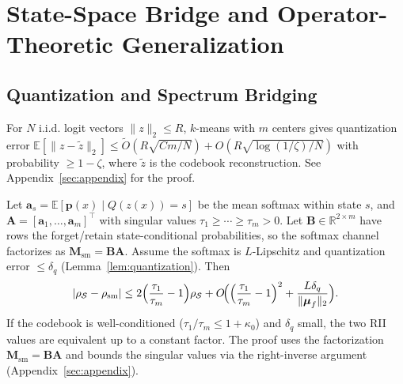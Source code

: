 \documentclass[smallextended]{svjour3}       %
\begin{document}
\section{State-Space Bridge and Operator-Theoretic Generalization}
\label{app:bridge}

\subsection{Quantization and Spectrum Bridging}

\begin{lemma}
\label{lem:quantization}
For $N$ i.i.d. logit vectors $\|z\|_2\le R$, $k$-means with $m$ centers gives quantization error $\mathbb{E}[\|z-\tilde{z}\|_2] \le \tilde{O}(R\sqrt{Cm/N}) + O(R\sqrt{\log(1/\zeta)/N})$ with probability $\ge1-\zeta$, where $\tilde{z}$ is the codebook reconstruction. See Appendix~\ref{sec:appendix} for the proof.
\end{lemma}

\begin{theorem}
\label{thm:state_bridge}
Let $\mathbf{a}_s = \mathbb{E}[\mathbf{p}(x) \mid Q(z(x))=s]$ be the mean softmax within state $s$, and $\mathbf{A} = [\mathbf{a}_1,\dots,\mathbf{a}_m]^\top$ with singular values $\tau_1 \ge \cdots \ge \tau_m > 0$. Let $\mathbf{B}\in\mathbb{R}^{2\times m}$ have rows the forget/retain state-conditional probabilities, so the softmax channel factorizes as $\mathbf{M}_{\mathrm{sm}}=\mathbf{B}\mathbf{A}$. Assume the softmax is $L$-Lipschitz and quantization error $\le \delta_q$ (Lemma~\ref{lem:quantization}). Then
\begin{equation}
|\rho_{\mathcal{S}} - \rho_{\mathrm{sm}}| \le 2\Bigl(\frac{\tau_1}{\tau_m}-1\Bigr)\rho_{\mathcal{S}} + O\!\Bigl(\Bigl(\frac{\tau_1}{\tau_m}-1\Bigr)^2 + \frac{L\delta_q}{\|\boldsymbol{\mu}_f\|_2}\Bigr).
\end{equation}
If the codebook is well-conditioned ($\tau_1/\tau_m \le 1+\kappa_0$) and $\delta_q$ small, the two RII values are equivalent up to a constant factor. The proof uses the factorization $\mathbf{M}_{\mathrm{sm}}=\mathbf{B}\mathbf{A}$ and bounds the singular values via the right-inverse argument (Appendix~\ref{sec:appendix}).
\end{theorem}
\end{document}
